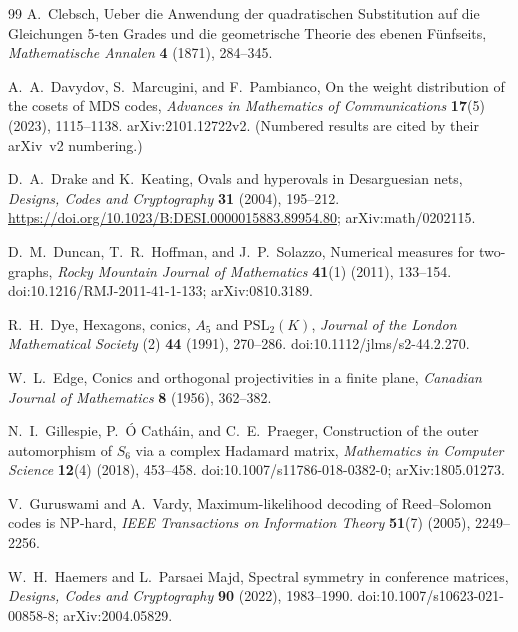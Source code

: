 \documentclass[11pt]{article}
\theoremstyle{definition}
\theoremstyle{remark}
\begin{document}
\begin{thebibliography}{99}
A.~Clebsch,
\newblock Ueber die Anwendung der quadratischen Substitution auf die
Gleichungen 5-ten Grades und die geometrische Theorie des ebenen Fünfseits,
\newblock \emph{Mathematische Annalen} \textbf{4} (1871), 284--345.

A.~A.~Davydov, S.~Marcugini, and F.~Pambianco,
\newblock On the weight distribution of the cosets of MDS codes,
\newblock \emph{Advances in Mathematics of Communications} \textbf{17}(5)
(2023), 1115--1138.
\newblock arXiv:2101.12722v2.
\newblock (Numbered results are cited by their arXiv~v2 numbering.)

D.~A.~Drake and K.~Keating,
\newblock Ovals and hyperovals in Desarguesian nets,
\newblock \emph{Designs, Codes and Cryptography} \textbf{31} (2004),
195--212.
\newblock \url{https://doi.org/10.1023/B:DESI.0000015883.89954.80};
arXiv:math/0202115.

D.~M.~Duncan, T.~R.~Hoffman, and J.~P.~Solazzo,
\newblock Numerical measures for two-graphs,
\newblock \emph{Rocky Mountain Journal of Mathematics} \textbf{41}(1)
(2011), 133--154.
\newblock doi:10.1216/RMJ-2011-41-1-133; arXiv:0810.3189.

R.~H.~Dye,
\newblock Hexagons, conics, $A_5$ and $\mathrm{PSL}_2(K)$,
\newblock \emph{Journal of the London Mathematical Society} (2) \textbf{44}
(1991), 270--286.
\newblock doi:10.1112/jlms/s2-44.2.270.

W.~L.~Edge,
\newblock Conics and orthogonal projectivities in a finite plane,
\newblock \emph{Canadian Journal of Mathematics} \textbf{8} (1956), 362--382.

N.~I.~Gillespie, P.~{\'O} Cath{\'a}in, and C.~E.~Praeger,
\newblock Construction of the outer automorphism of $S_6$ via a complex
Hadamard matrix,
\newblock \emph{Mathematics in Computer Science} \textbf{12}(4) (2018),
453--458.
\newblock doi:10.1007/s11786-018-0382-0; arXiv:1805.01273.

V.~Guruswami and A.~Vardy,
\newblock Maximum-likelihood decoding of Reed--Solomon codes is NP-hard,
\newblock \emph{IEEE Transactions on Information Theory} \textbf{51}(7)
(2005), 2249--2256.

W.~H.~Haemers and L.~Parsaei Majd,
\newblock Spectral symmetry in conference matrices,
\newblock \emph{Designs, Codes and Cryptography} \textbf{90} (2022),
1983--1990.
\newblock doi:10.1007/s10623-021-00858-8; arXiv:2004.05829.


\end{thebibliography}
\end{document}
